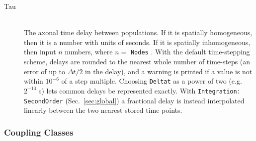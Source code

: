 \documentclass[12pt,a4paper]{article}
\newcommand{\type}[1]{{\small\small\tt #1} }
\begin{document}
\begin{itemize}
\begin{description}
    \item[Tau]\ \\
    The axonal time delay between populations. If it is spatially homogeneous, then it is a number with units of seconds. If it is spatially inhomogeneous, then input \(n\) numbers, where \(n=\) \type{Nodes}.
    With the default time-stepping scheme, delays are rounded to the nearest whole number of time-steps (an error of up to $\Delta t/2$ in the delay), and a warning is printed if a value is not within \(10^{-6}\) of a step multiple.
    Choosing \type{Deltat} as a power of two (e.g.\ \(2^{-13}\) s) lets common delays be represented exactly.
    With \type{Integration: SecondOrder} (Sec.~\ref{sec:global}) a fractional delay is instead interpolated linearly between the two nearest stored time points.

\end{description}
\end{itemize}

\subsubsection{Coupling Classes}
\label{sec:coupling}
\end{document}
